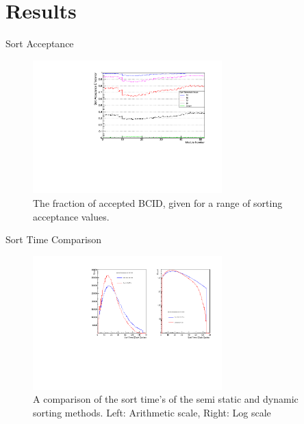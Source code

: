\documentclass[10pt, compress]{beamer}
\begin{document}
\section{Results}
\begin{frame}{Sort Acceptance}
	\begin{figure}
		\caption{The fraction of accepted BCID, given for a range of sorting acceptance values.} \vspace{-3.5em}
		\includegraphics[width=0.65\textwidth,angle=-90]{figs/Sort_Acceptance_Efficiancy.pdf}
		\centering
	\end{figure}
\end{frame}

\begin{frame}{Sort Time Comparison}
	\begin{figure}
		\caption{A comparison of the sort time's of the semi static and dynamic sorting methods. Left: Arithmetic scale, Right: Log scale} \vspace{-3.5em}
		\includegraphics[width=0.65\textwidth,angle=-90]{figs/semiStat_dyn_sort_time.pdf}
		\centering
	\end{figure}
\end{frame}
\end{document}
